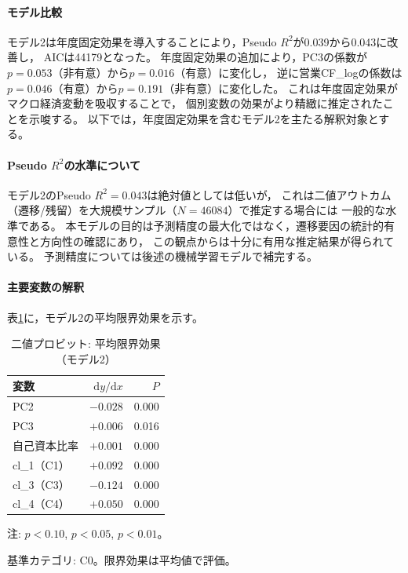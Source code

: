 \paragraph{モデル比較}
モデル2は年度固定効果を導入することにより，Pseudo $R^2$が0.039から0.043に改善し，
AICは\num{44179}となった。
年度固定効果の追加により，PC3の係数が$p=0.053$（非有意）から$p=0.016$（有意）に変化し，
逆に営業CF\_logの係数は$p=0.046$（有意）から$p=0.191$（非有意）に変化した。
これは年度固定効果がマクロ経済変動を吸収することで，
個別変数の効果がより精緻に推定されたことを示唆する。
以下では，年度固定効果を含むモデル2を主たる解釈対象とする。

\paragraph{Pseudo $R^2$の水準について}
モデル2のPseudo $R^2=0.043$は絶対値としては低いが，
これは二値アウトカム（遷移/残留）を大規模サンプル（$N=\num{46084}$）で推定する場合には
一般的な水準である。
本モデルの目的は予測精度の最大化ではなく，遷移要因の統計的有意性と方向性の確認にあり，
この観点からは十分に有用な推定結果が得られている。
予測精度については後述の機械学習モデルで補完する。

\paragraph{主要変数の解釈}
表\ref{tab:probit-marginal}に，モデル2の平均限界効果を示す。

\begin{table}[htbp]
  \centering
  \caption{二値プロビット: 平均限界効果（モデル2）}
  \label{tab:probit-marginal}
  \begin{tabular}{lrr}
    \toprule
    変数 & $\mathrm{d}y/\mathrm{d}x$ & $P$ \\
    \midrule
    PC2          & $-0.028$\sig{***} & 0.000 \\
    PC3          & $+0.006$\sig{*}   & 0.016 \\
    自己資本比率 & $+0.001$\sig{***} & 0.000 \\
    cl\_1（C1）  & $+0.092$\sig{***} & 0.000 \\
    cl\_3（C3）  & $-0.124$\sig{***} & 0.000 \\
    cl\_4（C4）  & $+0.050$\sig{***} & 0.000 \\
    \bottomrule
  \end{tabular}
  \begin{tablenotes}
    \small
    \item 注: \sig{*}$p<0.10$, \sig{**}$p<0.05$, \sig{***}$p<0.01$。
    \item 基準カテゴリ: C0。限界効果は平均値で評価。
  \end{tablenotes}
\end{table}

